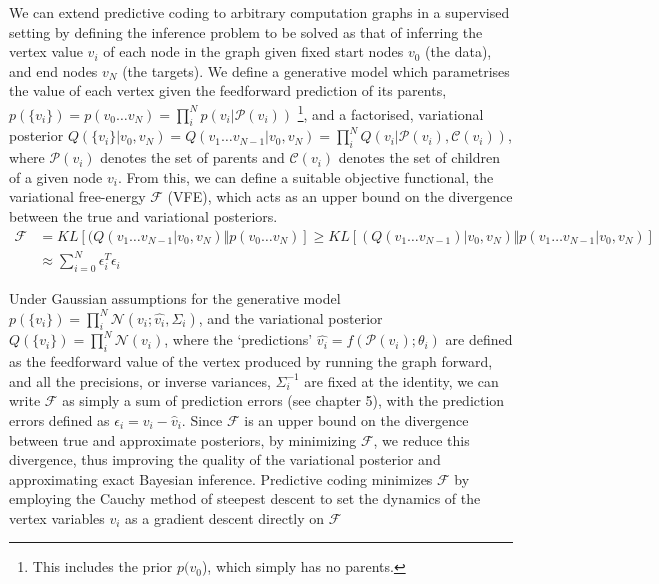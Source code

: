 We can extend predictive coding to arbitrary computation graphs in a supervised setting by defining the inference problem to be solved as that of inferring the vertex value $v_i$ of each node in the graph given fixed start nodes $v_0$ (the data), and end nodes $v_N$ (the targets). We define a generative model which parametrises the value of each vertex given the feedforward prediction of its parents, $p(\{v_i\}) = p(v_0 \dots v_N) = \prod_i^N p(v_i | \mathcal{P}(v_i) )$ \footnote{This includes the prior $p(v_0$), which simply has no parents.}, and a factorised, variational posterior $Q(\{v_i\} | v_0, v_N) = Q(v_1 \dots v_{N-1} | v_0, v_N) = \prod_i^N Q(v_i | \mathcal{P}(v_i), \mathcal{C}(v_i))$, where $\mathcal{P}(v_i)$ denotes the set of parents and $\mathcal{C}(v_i)$ denotes the set of children of a given node $v_i$. From this, we can define a suitable objective functional, the variational free-energy $\mathcal{F}$ (VFE), which acts as an upper bound on the divergence between the true and variational posteriors.
\begin{equation}
\begin{aligned}
    \mathcal{F} &= KL[(Q(v_1 \dots v_{N-1} | v_0, v_N) \Vert p(v_0 \dots v_N)] \geq  KL[(Q(v_1 \dots v_{N-1}) | v_0, v_N) \Vert p(v_1 \dots v_{N-1}| v_0, v_N)] \\
    &\approx \sum_{i=0}^N \epsilon_i^T \epsilon_i 
\end{aligned}
\end{equation}

Under Gaussian assumptions for the generative model $p(\{v_i\}) = \prod_i^N \mathcal{N}(v_i ; \hat{v_i}, \Sigma_i)$, and the variational posterior $Q(\{v_i\}) = \prod_i^N \mathcal{N}(v_i)$, where the `predictions' $\hat{v_i} = f(\mathcal{P}(v_i); \theta_i)$ are defined as the feedforward value of the vertex produced by running the graph forward, and all the precisions, or inverse variances, $\Sigma^{-1}_i$ are fixed at the identity, we can write $\mathcal{F}$ as simply a sum of prediction errors (see chapter 5), with the prediction errors defined as $\epsilon_i = v_i - \hat{v}_i$. Since $\mathcal{F}$ is an upper bound on the divergence between true and approximate posteriors, by minimizing $\mathcal{F}$, we reduce this divergence, thus improving the quality of the variational posterior and approximating exact Bayesian inference. Predictive coding minimizes $\mathcal{F}$ by employing the Cauchy method of steepest descent to set the dynamics of the vertex variables $v_i$ as a gradient descent directly on $\mathcal{F}$

